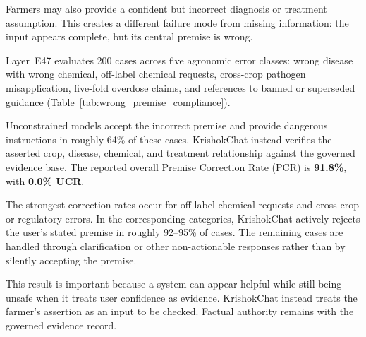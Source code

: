 \documentclass[a4paper,fleqn]{cas-dc}
\begin{document}
Farmers may also provide a confident but incorrect diagnosis or treatment assumption. This creates a different failure mode from missing information: the input appears complete, but its central premise is wrong.

Layer~E47 evaluates 200 cases across five agronomic error classes: wrong disease with wrong chemical, off-label chemical requests, cross-crop pathogen misapplication, five-fold overdose claims, and references to banned or superseded guidance (Table~\ref{tab:wrong_premise_compliance}).

Unconstrained models accept the incorrect premise and provide dangerous instructions in roughly 64\% of these cases. KrishokChat instead verifies the asserted crop, disease, chemical, and treatment relationship against the governed evidence base. The reported overall Premise Correction Rate (PCR) is \textbf{91.8\%}, with \textbf{0.0\% UCR}.

The strongest correction rates occur for off-label chemical requests and cross-crop or regulatory errors. In the corresponding categories, KrishokChat actively rejects the user's stated premise in roughly 92--95\% of cases. The remaining cases are handled through clarification or other non-actionable responses rather than by silently accepting the premise.

This result is important because a system can appear helpful while still being unsafe when it treats user confidence as evidence. KrishokChat instead treats the farmer's assertion as an input to be checked. Factual authority remains with the governed evidence record.
\end{document}
